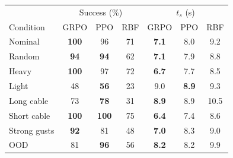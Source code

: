 \begin{tabular}{l ccc ccc}
\toprule
& \multicolumn{3}{c}{Success (\%)} & \multicolumn{3}{c}{$t_s$ (s)} \\
Condition & GRPO & PPO & RBF & GRPO & PPO & RBF \\
\midrule
Nominal & \textbf{100} & 96 & 71 & \textbf{7.1} & 8.0 & 9.2 \\
Random & \textbf{94} & \textbf{94} & 62 & \textbf{7.1} & 7.9 & 8.8 \\
Heavy & \textbf{100} & 97 & 72 & \textbf{6.7} & 7.7 & 8.5 \\
Light & 48 & \textbf{56} & 23 & 9.0 & \textbf{8.9} & 9.3 \\
Long cable & 73 & \textbf{78} & 31 & \textbf{8.9} & 8.9 & 10.5 \\
Short cable & \textbf{100} & \textbf{100} & 75 & \textbf{6.4} & 7.4 & 8.6 \\
Strong gusts & \textbf{92} & 81 & 48 & \textbf{7.0} & 8.3 & 9.0 \\
OOD & 81 & \textbf{96} & 56 & \textbf{8.2} & 8.2 & 9.9 \\
\bottomrule
\end{tabular}
